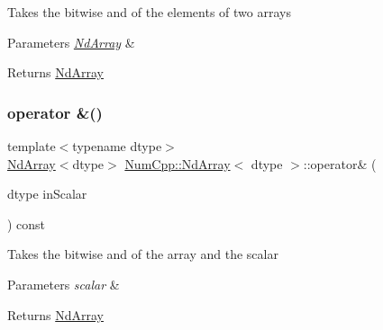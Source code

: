 Takes the bitwise and of the elements of two arrays


\begin{DoxyParams}{Parameters}
{\em \mbox{\hyperlink{class_num_cpp_1_1_nd_array}{Nd\+Array}}} & \\
\hline
\end{DoxyParams}
\begin{DoxyReturn}{Returns}
\mbox{\hyperlink{class_num_cpp_1_1_nd_array}{Nd\+Array}} 
\end{DoxyReturn}
\mbox{\label{class_num_cpp_1_1_nd_array_a60a4f9c8d912bb3d5129e561d8ddd847}} 
\subsubsection{\texorpdfstring{operator \&()}{operator \&()}\hspace{0.1cm}{\footnotesize\ttfamily [2/2]}}
{\footnotesize\ttfamily template$<$typename dtype$>$ \\
\mbox{\hyperlink{class_num_cpp_1_1_nd_array}{Nd\+Array}}$<$dtype$>$ \mbox{\hyperlink{class_num_cpp_1_1_nd_array}{Num\+Cpp\+::\+Nd\+Array}}$<$ dtype $>$\+::operator\& (\begin{DoxyParamCaption}\item[{dtype}]{in\+Scalar }\end{DoxyParamCaption}) const\hspace{0.3cm}{\ttfamily [inline]}}

Takes the bitwise and of the array and the scalar


\begin{DoxyParams}{Parameters}
{\em scalar} & \\
\hline
\end{DoxyParams}
\begin{DoxyReturn}{Returns}
\mbox{\hyperlink{class_num_cpp_1_1_nd_array}{Nd\+Array}} 
\end{DoxyReturn}
\mbox{\label{class_num_cpp_1_1_nd_array_ae5778250ad10187826c880f9de361c03}} 

